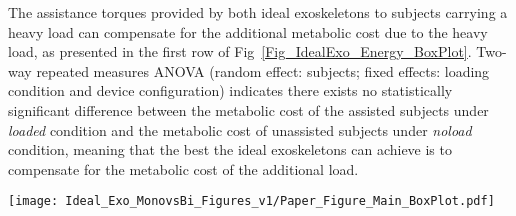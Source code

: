 \documentclass[10pt,letterpaper]{article}
\begin{document}
The assistance torques provided by both ideal exoskeletons to subjects carrying a heavy load can compensate for the additional metabolic cost due to the heavy load, as presented in the first row of Fig~\ref{Fig_IdealExo_Energy_BoxPlot}. Two-way repeated measures ANOVA (random effect: subjects; fixed effects: loading condition and device configuration) indicates there exists no statistically significant difference between the metabolic cost of the assisted subjects under \textit{loaded} condition and the metabolic cost of unassisted subjects under \textit{noload} condition, meaning that the best the ideal exoskeletons can achieve is to compensate for the metabolic cost of the additional load.

\begin{figure*}[h!]
	\centering
	\texttt{[image: Ideal\_Exo\_MonovsBi\_Figures\_v1/Paper\_Figure\_Main\_BoxPlot.pdf]}
	\vspace{-3mm}
	\caption{\small{\textbf{The average absolute power consumption of exoskeletons, maximum positive power of exoskeletons and  metabolic rate of subjects.} The average absolute and the positive peak power consumption of assistive actuators at each joint and their effect on whole-body metabolic rate of the subjects while walking under noload and loaded conditions. Superscripts indicate statistically significant differences over 7 subjects with 3 trails, with Tukey Post-hoc test and $P < 0.05$.}}
	\label{Fig_IdealExo_Energy_BoxPlot}
\end{figure*} %
\end{document}
